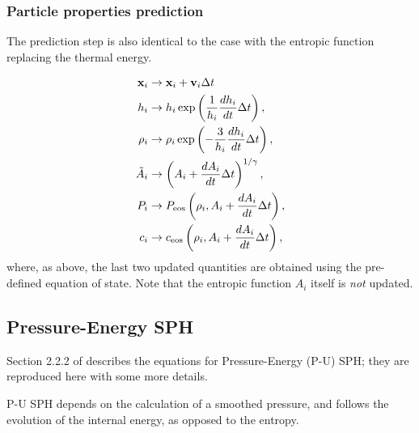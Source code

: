 \subsubsection{Particle properties prediction}

The prediction step is also identical to the \MinimalSPH case with the
entropic function replacing the thermal energy.

\begin{align}
  \vec{x}_i &\rightarrow \vec{x}_i + \vec{v}_i \Delta t 
\label{eq:sph:pe:drift_x} \\
  h_i &\rightarrow h_i \exp\left(\frac{1}{h_i} \frac{dh_i}{dt}
  \Delta t\right), \label{eq:sph:pe:drift_h}\\
  \rho_i &\rightarrow \rho_i \exp\left(-\frac{3}{h_i} \frac{dh_i}{dt}
  \Delta t\right), \label{eq:sph:pe:drift_rho} \\
  \tilde A_i &\rightarrow \left(A_i + \frac{dA_i}{dt}
  \Delta t\right)^{1/\gamma} \label{eq:sph:pe:drift_A_tilde}, \\
  P_i &\rightarrow P_{\rm eos}\left(\rho_i, A_i + \frac{dA_i}{dt} \Delta
t\right), \label{eq:sph:pe:drift_P}\\
  c_i &\rightarrow c_{\rm eos}\left(\rho_i, A_i + \frac{dA_i}{dt}
  \Delta t\right) \label{eq:sph:pe:drift_c}, 
\end{align}
where, as above, the last two updated quantities are obtained using
the pre-defined equation of state. Note that the entropic function $A_i$
itself is \emph{not} updated.

\subsection{Pressure-Energy SPH}
\label{sec:sph:pu}

Section 2.2.2 of \cite{Hopkins2013} describes the equations for Pressure-Energy
(P-U) SPH; they are reproduced here with some more details.

P-U SPH depends on the calculation of a smoothed pressure, and follows the
evolution of the internal energy, as opposed to the entropy.


